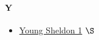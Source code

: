 	\paragraph{Y} \hypertarget{SY}{}	
		\begin{itemize}
			
			\item \href{https://mega.nz/#F!2G5CGIBB!d20q11PyVIcL8-m5P52eyQ} {Young Sheldon 1}  $\S$ \\ 

			
			
		\end{itemize}